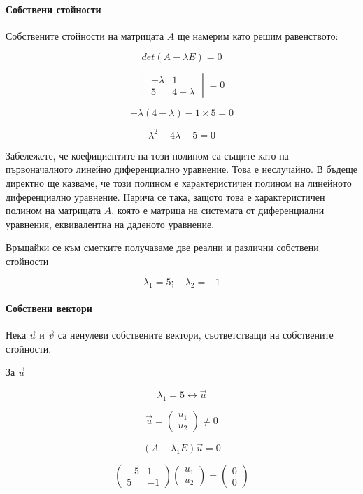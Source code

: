 \documentclass{scrartcl}
\begin{document}
\paragraph{Собствени стойности}

Собствените стойности на матрицата $A$ ще намерим като решим равенството:

$$det(A-\lambda E) = 0$$

$$
\begin{vmatrix}
-\lambda & 1 \\ 5 & 4-\lambda
\end{vmatrix}
= 0
$$

$$-\lambda(4-\lambda) - 1\times5 = 0$$

$$\lambda^2 - 4\lambda - 5 = 0$$

Забележете, че коефициентите на този полином са същите като на първоначалното линейно диференциално уравнение. Това е неслучайно. В бъдеще директно ще казваме, че този полином е характеристичен полином на линейното диференциално уравнение. Нарича се така, защото това е характеристичен полином на матрицата $A$, която е матрица на системата от диференциални уравнения, еквивалентна на даденото уравнение.

Връщайки се към сметките получаваме две реални и различни собствени стойности

$$\lambda_1 = 5;\quad \lambda_2 = -1$$

\paragraph{Собствени вектори}

Нека $\overrightarrow{u}$ и $\overrightarrow{v}$ са ненулеви собствените вектори, съответстващи на собствените стойности.

За $\overrightarrow{u}$

$$\lambda_1 = 5 \longleftrightarrow \overrightarrow{u}$$

$$
\overrightarrow{u} =
\begin{pmatrix}
    u_1\\u_2
\end{pmatrix}
\ne 0
$$

$$(A-\lambda_1 E)\overrightarrow{u} = 0$$

$$
\begin{pmatrix}
    -5 & 1\\
    5 & -1
\end{pmatrix}
\begin{pmatrix}
    u_1\\
    u_2
\end{pmatrix}
=
\begin{pmatrix}
    0\\
    0
\end{pmatrix}
$$
\end{document}
